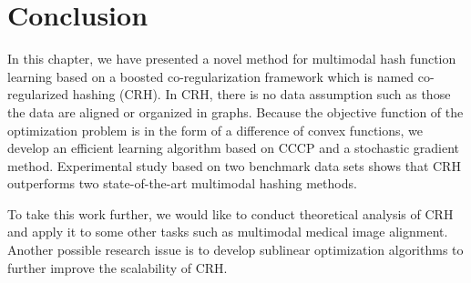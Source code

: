 
\section{Conclusion}
\label{crh:conclusion}

In this chapter, we have presented a novel method for multimodal hash function learning based on a boosted co-regularization framework which is named co-regularized hashing (CRH). In \mbox{CRH}, there is no data assumption such as those the data are aligned or organized in graphs. Because the objective function of the optimization problem is in the form of a difference of convex functions, we develop an efficient learning algorithm based on \mbox{CCCP} and a stochastic gradient method.  Experimental study based on two benchmark data sets shows that \mbox{CRH} outperforms two state-of-the-art multimodal hashing methods.

To take this work further, we would like to conduct theoretical analysis of \mbox{CRH} and apply it to some other tasks such as multimodal medical image alignment. Another possible research issue is to develop sublinear optimization algorithms to further improve the scalability of \mbox{CRH}.

